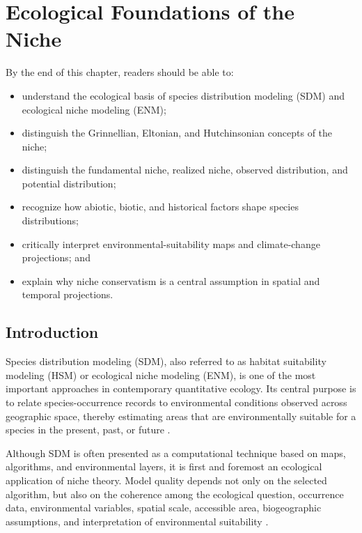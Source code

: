 \chapter{Ecological Foundations of the Niche}

\begin{objetivos}
By the end of this chapter, readers should be able to:
\begin{itemize}
  \item understand the ecological basis of species distribution modeling (SDM) and ecological niche modeling (ENM);
  \item distinguish the Grinnellian, Eltonian, and Hutchinsonian concepts of the niche;
  \item distinguish the fundamental niche, realized niche, observed distribution, and potential distribution;
  \item recognize how abiotic, biotic, and historical factors shape species distributions;
  \item critically interpret environmental-suitability maps and climate-change projections; and
  \item explain why niche conservatism is a central assumption in spatial and temporal projections.
\end{itemize}
\end{objetivos}

\section{Introduction}

Species distribution modeling (SDM), also referred to as habitat suitability
modeling (HSM) or ecological niche modeling (ENM), is one of the most important
approaches in contemporary quantitative ecology. Its central purpose is to
relate species-occurrence records to environmental conditions observed across
geographic space, thereby estimating areas that are environmentally suitable
for a species in the present, past, or future
\parencite{guisan2000,guisan2005predicting,guisan2017habitat,elith2009,franklin2010}.

Although SDM is often presented as a computational technique based on maps,
algorithms, and environmental layers, it is first and foremost an ecological
application of niche theory. Model quality depends not only on the selected
algorithm, but also on the coherence among the ecological question,
occurrence data, environmental variables, spatial scale, accessible area,
biogeographic assumptions, and interpretation of environmental suitability
\parencite{peterson2011,guisan2017habitat,barve2011crucial}.

